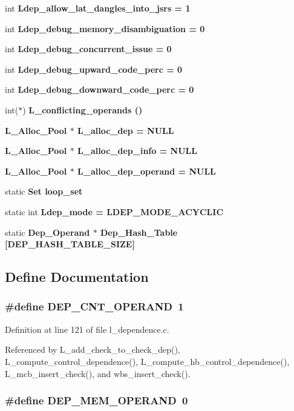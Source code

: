 \begin{CompactItemize}
int \bf{Ldep\_\-allow\_\-lat\_\-dangles\_\-into\_\-jsrs} = 1
\item 
int \bf{Ldep\_\-debug\_\-memory\_\-disambiguation} = 0
\item 
int \bf{Ldep\_\-debug\_\-concurrent\_\-issue} = 0
\item 
int \bf{Ldep\_\-debug\_\-upward\_\-code\_\-perc} = 0
\item 
int \bf{Ldep\_\-debug\_\-downward\_\-code\_\-perc} = 0
\item 
int($\ast$) \bf{L\_\-conflicting\_\-operands} ()
\item 
\bf{L\_\-Alloc\_\-Pool} $\ast$ \bf{L\_\-alloc\_\-dep} = \bf{NULL}
\item 
\bf{L\_\-Alloc\_\-Pool} $\ast$ \bf{L\_\-alloc\_\-dep\_\-info} = \bf{NULL}
\item 
\bf{L\_\-Alloc\_\-Pool} $\ast$ \bf{L\_\-alloc\_\-dep\_\-operand} = \bf{NULL}
\item 
static \bf{Set} \bf{loop\_\-set}
\item 
static int \bf{Ldep\_\-mode} = LDEP\_\-MODE\_\-ACYCLIC
\item 
static \bf{Dep\_\-Operand} $\ast$ \bf{Dep\_\-Hash\_\-Table} [DEP\_\-HASH\_\-TABLE\_\-SIZE]
\end{CompactItemize}


\subsection{Define Documentation}
\subsubsection{\setlength{\rightskip}{0pt plus 5cm}\#define DEP\_\-CNT\_\-OPERAND~1}\label{l__dependence_8c_ed4f1e9cee538335bc3a17a0c73241c3}




Definition at line 121 of file l\_\-dependence.c.

Referenced by L\_\-add\_\-check\_\-to\_\-check\_\-dep(), L\_\-compute\_\-control\_\-dependence(), L\_\-compute\_\-hb\_\-control\_\-dependence(), L\_\-mcb\_\-insert\_\-check(), and wbs\_\-insert\_\-check().
\subsubsection{\setlength{\rightskip}{0pt plus 5cm}\#define DEP\_\-MEM\_\-OPERAND~0}\label{l__dependence_8c_a1a43eadd7bb31302abdeb28f606497b}




